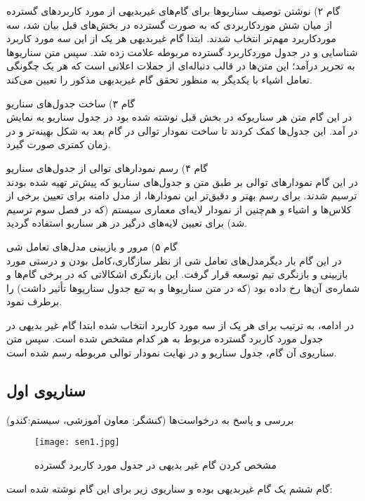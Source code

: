 \documentclass{report}
\begin{document}
گام ۲) نوشتن توصیف سناریوها برای گام‌های غیربدیهی از مورد کاربردهای گسترده\\
 از میان شش موردکاربردی که به صورت گسترده در بخش‌های قبل بیان شد، سه موردکاربرد مهم‌تر انتخاب شدند.
ابتدا گام غیربدیهی هر یک از این سه مورد کاربرد شناسایی و در جدول موردکاربرد گسترده‌ مربوطه علامت زده شد. سپس متن سناریوها به تحریر درآمد؛ این متن‌ها در قالب دنباله‌ای از جملات اعلانی است که هر یک چگونگی تعامل  اشیاء با یکدیگر به منظور تحقق گام غیربدیهی مذکور را تعیین می‌کند.

گام ۳) ساخت جدول‌های سناریو\\
در این گام متن هر سناریوکه در بخش قبل نوشته شده بود در جدول سناریو به نمایش در آمد. این جدول‌ها کمک کردند تا ساخت نمودار توالی در گام بعد به شکل بهینه‌تر و در زمان کمتری صورت گیرد.

گام ۴) رسم نمودارهای توالی از جدول‌های سناریو\\
در این گام نمودارهای توالی 
 بر طبق متن و جدول‌های سناریو که پیش‌تر تهیه شده بودند ترسیم  شدند. برای رسم بهتر و دقیق‌تر این نمودارها، از مدل دامنه برای تعیین برخی از کلاس‌ها و اشیاء و هم‌چنین از نمودار لایه‌ای  معماری سیستم (که در فصل سوم ترسیم شد) برای تعیین لایه‌های درگیر در هر سناریو استفاده گردید.

گام ۵) مرور و بازبینی مدل‌های تعامل شی\\
در این گام بار دیگرمدل‌های تعامل شی از نظر سازگاری،کامل بودن و درستی مورد بازبینی و بازنگری تیم توسعه قرار گرفت. این بازنگری اشکالاتی که در برخی گام‌ها و شماره‌ی آن‌ها رخ داده بود (که در متن سناریوها و به تبع جدول سناریو‌ها تأثیر داشت) را برطرف نمود.

در ادامه، به ترتیب برای هر یک از سه مورد کاربرد انتخاب شده ابتدا گام غیر بدیهی در جدول مورد کاربرد گسترده مربوط به هر کدام مشخص شده است. سپس متن سناریوی آن گام، جدول سناریو و در نهایت نمودار توالی
 مربوطه رسم شده است.
 \clearpage
\subsection*{سناریوی اول}


\textbf{}
بررسی و پاسخ به درخواست‌ها (کنشگر: معاون آموزشی، سیستم:کندو)
\begin{figure}[!htb]
\centering
\texttt{[image: sen1.jpg]}
\caption{مشخص کردن گام غیر بدیهی در جدول مورد کاربرد گسترده}
\end{figure} 
\clearpage
گام ششم یک گام غیربدیهی بوده و سناریوی زیر برای این گام نوشته شده است:
\end{document}
